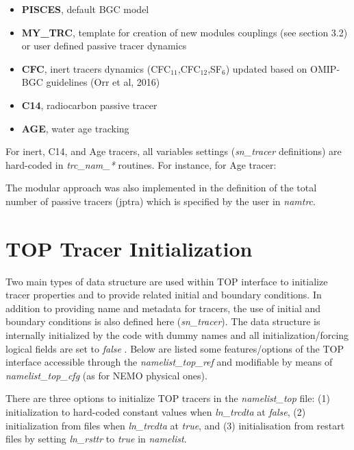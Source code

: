 \documentclass[../main/TOP_manual]{subfiles}
\begin{document}
\begin{itemize}
        \item \textbf{PISCES}, default BGC model
        \item \textbf{MY\_TRC}, template for creation of new modules couplings (see section 3.2) or user defined passive tracer dynamics
        \item \textbf{CFC}, inert tracers dynamics (CFC$_{11}$,CFC$_{12}$,SF$_{6}$) updated based on OMIP-BGC guidelines (Orr et al, 2016)
        \item \textbf{C14}, radiocarbon passive tracer
        \item \textbf{AGE}, water age tracking
\end{itemize}

For inert, C14, and Age tracers, all variables settings (\textit{sn\_tracer} definitions) are hard-coded in \textit{trc\_nam\_*} routines. For instance, for Age tracer:

The modular approach was also implemented in the definition of the total number of passive tracers (jptra) which is specified by the user in \textit{namtrc}.

\section{ TOP Tracer Initialization}

Two main types of data structure are used within TOP interface to initialize tracer properties and to provide related initial and boundary conditions. 
In addition to providing name and metadata for tracers, the use of initial and boundary conditions is also defined here (\textit{sn\_tracer}).
The data structure is internally initialized by the code with dummy names and all initialization/forcing logical fields are set to \textit{false} .
Below are listed some features/options of the TOP interface accessible through the \textit{namelist\_top\_ref} and modifiable by means of \textit{namelist\_top\_cfg} (as for NEMO physical ones).

There are three options to initialize TOP tracers in the \textit{namelist\_top } file: (1) initialization to hard-coded constant values when \textit{ln\_trcdta} at \textit{false}, (2) initialization from files when \textit{ln\_trcdta} at \textit{true}, and (3) initialisation from restart files by setting \textit{ln\_rsttr} to \textit{true} in \textit{namelist}.
\end{document}
